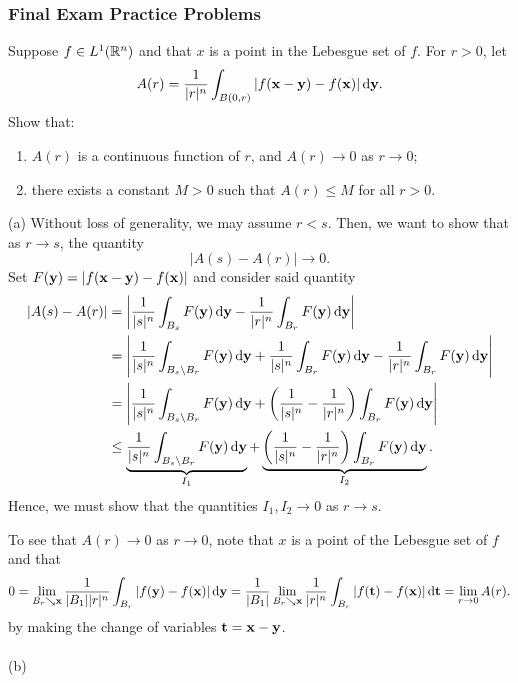 \subsubsection{Final Exam Practice Problems}
\setcounter{exercise}{0}
\setcounter{equation}{0}

\begin{problem}
Suppose $f\in L^1(\mathbb{R}^n)$ and that $x$ is a point in the Lebesgue set of
$f$. For $r>0$, let
\[
A(r)=\frac{1}{|r|^n}\int_{B(0,r)}|f(\mathbf{x}-\mathbf{y})-f(\mathbf{x})|\mathop{}\!\mathrm{d}\mathbf{y}.
\]
Show that:
\begin{enumerate}[label=(\alph*),noitemsep]
\item $A(r)$ is a continuous function of $r$, and $A(r)\to 0$ as $r\to 0$;
\item there exists a constant $M>0$ such that $A(r)\leq M$ for all $r>0$.
\end{enumerate}
\end{problem}
\begin{solution}
(a) Without loss of generality, we may assume $r<s$. Then, we want to show
that as $r\to s$, the quantity
\[
|A(s)-A(r)|\longrightarrow 0.
\]
Set $F(\mathbf{y})= |f(\mathbf{x}-\mathbf{y})-f(\mathbf{x})|$ and consider said quantity
\begin{align*}
|A(s)-A(r)|
&=\left|
\frac{1}{|s|^n}\int_{B_s}F(\bfy)\diff\bfy
-
\frac{1}{|r|^n}\int_{B_r}F(\bfy)\diff\bfy
\right|\\
&=\left|
\frac{1}{|s|^n}\int_{B_s\setminus B_r}F(\bfy)\diff\bfy+
\frac{1}{|s|^n}\int_{B_r}F(\bfy)\diff\bfy-
\frac{1}{|r|^n}\int_{B_r}F(\bfy)\diff\bfy
\right|\\
&=\left|
\frac{1}{|s|^n}\int_{B_s\setminus B_r}F(\bfy)\diff\bfy
+\left(\frac{1}{|s|^n}-\frac{1}{|r|^n}\right)\int_{B_r}F(\bfy)\diff\bfy
\right|\\
&\leq
\underbrace{\frac{1}{|s|^n}\int_{B_s\setminus B_r}F(\bfy)\diff\bfy}_{I_1}
+\underbrace{\left(\frac{1}{|s|^n}-\frac{1}{|r|^n}\right)\int_{B_r}F(\bfy)\diff\bfy}_{I_2}.
\end{align*}
Hence, we must show that the quantities $I_1,I_2\to 0$ as $r\to s$.

To see that $A(r)\to 0$ as $r\to 0$, note that $x$ is a point of the
Lebesgue set of $f$ and that
\[
0=\lim_{B_r\searrow\mathbf{x}}\frac{1}{|B_1||r|^n}\int_{B_r}|f(\mathbf{y})-f(\mathbf{x})|\mathop{}\!\mathrm{d}\mathbf{y}=\frac{1}{|B_1|}\lim_{B_r\searrow\mathbf{x}}\frac{1}{|r|^n}\int_{B_r}|f(\mathbf{t})-f(\mathbf{x})|\mathop{}\!\mathrm{d}\mathbf{t}=\lim_{r\to
0}A(r).
\]
by making the change of variables $\mathbf{t}=\mathbf{x}-\mathbf{y}$.
\\\\
(b)
\end{solution}

